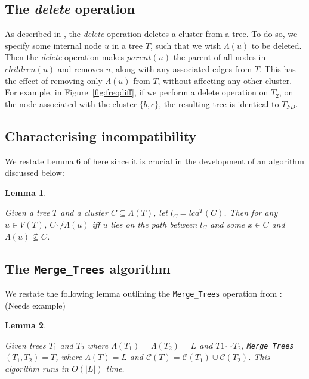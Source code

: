 \documentclass{article}
\newcommand{\compatible}{\smile}
\newcommand{\leafset}{\Lambda}
\newtheorem{incompatibility}{Lemma}
\newtheorem{mergetrees}[incompatibility]{Lemma}
\begin{document}
    \subsection{The \textit{delete} operation}
    \label{subsec:delete}

    As described in \cite{jansson2018algorithms}, the \textit{delete} operation deletes a cluster from a tree. To do so, we specify some internal node $u$ in a tree $T$, such that we wish $\leafset(u)$ to be deleted. Then the \textit{delete} operation makes $parent(u)$ the parent of all nodes in $children(u)$ and removes $u$, along with any associated edges from $T$. This has the effect of removing only $\leafset(u)$ from $T$, without affecting any other cluster. For example, in Figure~\ref{fig:freqdiff}, if we perform a delete operation on $T_2$, on the node associated with the cluster $\{b, c\}$, the resulting tree is identical to $T_{FD}$.

    \subsection{Characterising incompatibility}

    We restate Lemma 6 of \cite{jansson2018algorithms} here since it is crucial in the development of an algorithm discussed below:
    \newline

    \begin{incompatibility}
        \label{lem:incompatibility}

        Given a tree $T$ and a cluster $C \subseteq \leafset(T)$, let $l_C = lca^T(C)$. Then for any $u \in V(T)$, $C \not\compatible \leafset(u)$ iff $u$ lies on the path between $l_C$ and some $x \in C$ and $\leafset(u) \not\subseteq C$.
    \end{incompatibility}

    \subsection{The \texttt{Merge\_Trees} algorithm}
    \label{subsec:mergetrees}

    We restate the following lemma outlining the \texttt{Merge\_Trees} operation from \cite{jansson2016improved}: {\color{red}(Needs example)}
    \newline

    \begin{mergetrees}
        \label{lem:mergetrees}

        Given trees $T_1$ and $T_2$ where $\leafset(T_1) = \leafset(T_2) = L$ and $T1 \compatible T_2$, \texttt{Merge\_Trees}$(T_1, T_2) = T$, where $\leafset(T) = L$ and $\mathcal{C}(T) = \mathcal{C}(T_1) \cup \mathcal{C}(T_2)$. This algorithm runs in $O(|L|)$ time.
    \end{mergetrees}
\end{document}
